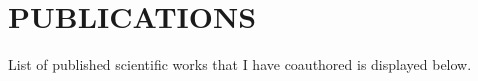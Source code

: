 \documentclass[line,margin]{res}
\begin{document}
\nocite{*}

\newpage
\section{PUBLICATIONS} 
List of published scientific works that I have coauthored is displayed below. \\

\renewcommand{\section}[2]{}%

\let\oldbibliography\thebibliography
\renewcommand{\thebibliography}[1]{%
  \oldbibliography{#1}%
  \leftskip=-\hoffset
}



\end{document}
